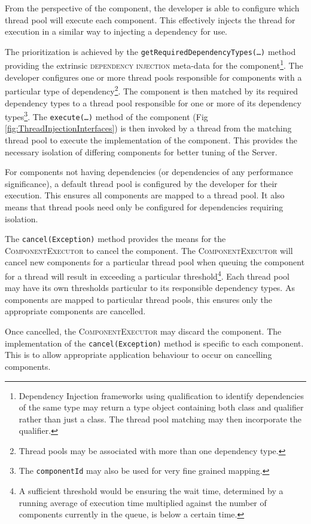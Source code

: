 \documentclass[prodmode]{style/acmlarge}
\begin{document}
From the perspective of the component, the developer is able to configure which
thread pool will execute each component.  This effectively injects the thread
for execution in a similar way to injecting a dependency for use.

The prioritization is achieved by the
\texttt{getRequiredDependencyTypes(\ldots)} method providing the extrinsic
\textsc{dependency injection} \cite{ioc} meta-data for the
component\footnote{Dependency Injection frameworks using qualification to
identify dependencies of the same type may return a type object containing both
class and qualifier rather than just a class.  The thread pool matching may then
incorporate the qualifier.}.  The developer configures one or more thread pools
responsible for components with a particular type of dependency\footnote{Thread
pools may be associated with more than one dependency type.}.  The component is
then matched by its required dependency types to a thread pool responsible for
one or more of its dependency types\footnote{The \texttt{componentId} may also
be used for very fine grained mapping.}.  The \texttt{execute(\ldots)} method of
the component (Fig \ref{fig:ThreadInjectionInterfaces}) is then invoked by a thread
from the matching thread pool to execute the implementation of the component.
This provides the necessary isolation of differing components for better tuning
of the Server.

For components not having dependencies (or dependencies of any
performance significance), a default thread pool is configured by the developer
for their execution.  This ensures all components are mapped to a
thread pool.  It also means that thread pools need only be configured for
dependencies requiring isolation.

The \texttt{cancel(Exception)} method provides the means for the
\textsc{ComponentExecutor} to cancel the component.  The
\textsc{ComponentExecutor} will cancel new components for a particular thread
pool when queuing the component for a thread will result in exceeding a
particular threshold\footnote{A sufficient threshold would be ensuring the wait
time, determined by a running average of execution time multiplied against the
number of components currently in the queue, is below a certain time.}.  Each
thread pool may have its own thresholds particular to its responsible dependency
types.  As components are mapped to particular thread pools, this ensures only
the appropriate components are cancelled.

Once cancelled, the \textsc{ComponentExecutor} may discard the component.  The
implementation of the \texttt{cancel(Exception)} method is specific to each
component.  This is to allow appropriate application behaviour to occur on
cancelling components.
\end{document}
